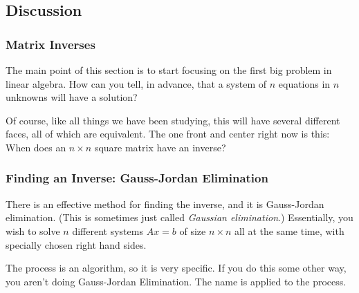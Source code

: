\documentclass[10pt,]{book}
\theoremstyle{plain}
\theoremstyle{definition}
\numberwithin{equation}{section}
\begin{document}
\subsection[Discussion]{Discussion}\label{subsection-43}
\typeout{************************************************}
\typeout{************************************************}
\subsubsection[Matrix Inverses]{Matrix Inverses}\label{subsubsection-20}

        The main point of this section is to start focusing on the first big
        problem in linear algebra. How can you tell, in advance, that a system
        of \(n\) equations in \(n\) unknowns will have a solution?
\par

        Of course, like all things we have been studying, this will have several
        different faces, all of which are equivalent. The one front and center
        right now is this: When does an \(n \times n\) square matrix have an inverse?
\typeout{************************************************}
\typeout{************************************************}
\subsubsection[Finding an Inverse: Gauss-Jordan Elimination]{Finding an Inverse: Gauss-Jordan Elimination}\label{subsubsection-21}

        There is an effective method for finding the inverse, and it is
        Gauss-Jordan elimination. (This is sometimes just called
        \emph{Gaussian elimination}.) Essentially, you wish to solve \(n\)
        different systems \(Ax= b\) of size \(n\times n\) all at the same
        time, with specially chosen right hand sides.
\par

        The process is an algorithm, so it is very specific. If you do this some
        other way, you aren't doing Gauss-Jordan Elimination. The name is applied
        to the process.
\par
\end{document}

